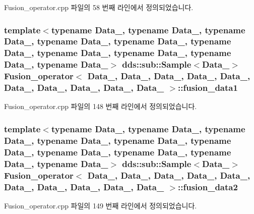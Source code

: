 Fusion\+\_\+operator.\+cpp 파일의 58 번째 라인에서 정의되었습니다.

\subsubsection[{\texorpdfstring{fusion\+\_\+data1}{fusion_data1}}]{\setlength{\rightskip}{0pt plus 5cm}template$<$typename Data\+\_, typename Data\+\_, typename Data\+\_, typename Data\+\_, typename Data\+\_, typename Data\+\_, typename Data\+\_, typename Data\+\_, typename Data\+\_, typename Data\+\_$>$ dds\+::sub\+::\+Sample$<$Data\+\_$>$ {\bf Fusion\+\_\+operator}$<$ Data\+\_, Data\+\_, Data\+\_, Data\+\_, Data\+\_, Data\+\_, Data\+\_, Data\+\_, Data\+\_, Data\+\_ $>$\+::fusion\+\_\+data1}\hypertarget{classFusion__operator_accd0def1ab312df9918676814257da82}{}\label{classFusion__operator_accd0def1ab312df9918676814257da82}


Fusion\+\_\+operator.\+cpp 파일의 148 번째 라인에서 정의되었습니다.

\subsubsection[{\texorpdfstring{fusion\+\_\+data2}{fusion_data2}}]{\setlength{\rightskip}{0pt plus 5cm}template$<$typename Data\+\_, typename Data\+\_, typename Data\+\_, typename Data\+\_, typename Data\+\_, typename Data\+\_, typename Data\+\_, typename Data\+\_, typename Data\+\_, typename Data\+\_$>$ dds\+::sub\+::\+Sample$<$Data\+\_$>$ {\bf Fusion\+\_\+operator}$<$ Data\+\_, Data\+\_, Data\+\_, Data\+\_, Data\+\_, Data\+\_, Data\+\_, Data\+\_, Data\+\_, Data\+\_ $>$\+::fusion\+\_\+data2}\hypertarget{classFusion__operator_a8c545bb751bfdda39be20b56b4aa7cbc}{}\label{classFusion__operator_a8c545bb751bfdda39be20b56b4aa7cbc}


Fusion\+\_\+operator.\+cpp 파일의 149 번째 라인에서 정의되었습니다.

